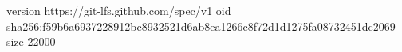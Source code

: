 version https://git-lfs.github.com/spec/v1
oid sha256:f59b6a6937228912bc8932521d6ab8ea1266c8f72d1d1275fa08732451dc2069
size 22000
